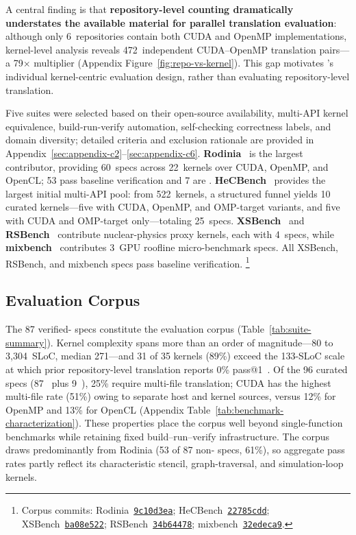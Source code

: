 A central finding is that \textbf{repository-level counting dramatically understates the available material for parallel translation evaluation}: although only 6~repositories contain both CUDA and OpenMP implementations, kernel-level analysis reveals 472~independent CUDA--OpenMP translation pairs---a 79$\times$ multiplier (Appendix Figure~\ref{fig:repo-vs-kernel}). This gap motivates \parbench{}'s individual kernel-centric evaluation design, rather than evaluating repository-level translation.


Five suites were selected based on their open-source availability, multi-API kernel equivalence, build-run-verify automation, self-checking correctness labels, and domain diversity; detailed criteria and exclusion rationale are provided in Appendix~\ref{sec:appendix-c2}--\ref{sec:appendix-c6}. \textbf{Rodinia}~\cite{Rodinia2009} is the largest contributor, providing 60~specs across 22~kernels over CUDA, OpenMP, and OpenCL; 53 pass baseline verification and 7 are \knownfail{}. \textbf{HeCBench}~\cite{HeCBench2023} provides the largest initial multi-API pool: from 522~kernels, a structured funnel yields 10 curated kernels---five with CUDA, OpenMP, and OMP-target variants, and five with CUDA and OMP-target only---totaling 25~specs.
\textbf{XSBench}~\cite{XSBench2014} and \textbf{RSBench}~\cite{RSBench2015} contribute nuclear-physics proxy kernels, each with 4~specs, while \textbf{mixbench}~\cite{mixbench2017} contributes 3~GPU roofline micro-benchmark specs. All XSBench, RSBench, and mixbench specs pass baseline verification. \footnote{Corpus commits: Rodinia~\href{https://github.com/yuhc/gpu-rodinia/tree/9c10d3ea}{\texttt{9c10d3ea}}; HeCBench~\href{https://github.com/ORNL/HeCBench/tree/22785cdd}{\texttt{22785cdd}}; XSBench~\href{https://github.com/ANL-CESAR/XSBench/tree/ba08e522}{\texttt{ba08e522}}; RSBench~\href{https://github.com/ANL-CESAR/RSBench/tree/34b64478}{\texttt{34b64478}}; mixbench~\href{https://github.com/ekondis/mixbench/tree/32edeca9}{\texttt{32edeca9}}.}

\subsection{Evaluation Corpus}
\label{sec:eval-corpus}

The 87 verified-\pass{} specs constitute the evaluation corpus (Table~\ref{tab:suite-summary}). Kernel complexity spans more than an order of magnitude---80 to 3{,}304~SLoC, median 271---and 31 of 35 kernels (89\%) exceed the 133-SLoC scale at which prior repository-level translation reports 0\% pass@1~\cite{ParEvalRepo2025}. Of the 96 curated specs (87~\pass{} plus 9~\knownfail{}), 25\% require multi-file translation; CUDA has the highest multi-file rate (51\%) owing to separate host and kernel sources, versus 12\% for OpenMP and 13\% for OpenCL (Appendix Table~\ref{tab:benchmark-characterization}). These properties place the corpus well beyond single-function benchmarks while retaining fixed build--run--verify infrastructure. The corpus draws predominantly from Rodinia (53 of 87 non-\knownfail{} specs, 61\%), so aggregate pass rates partly reflect its characteristic stencil, graph-traversal, and simulation-loop kernels.

